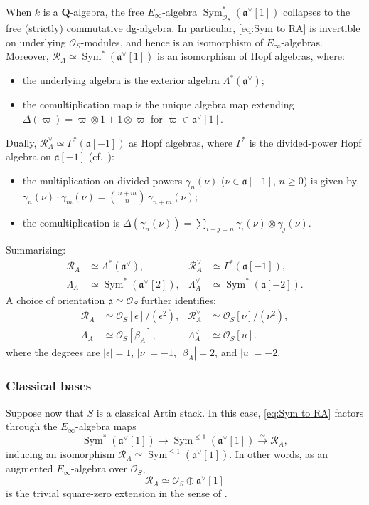 \documentclass[12pt, oneside]{amsart}
\numberwithin{equation}{section}
\theoremstyle{remark}
\theoremstyle{plain}
\renewcommand{\ge}{\geqslant}
\renewcommand{\le}{\leqslant}
\newcommand{\R}{\mathcal{R}}
\newcommand{\RA}{\R_A}
\newcommand{\fra}{\mathfrak{a}}
\newcommand{\frav}{\mathfrak{a}^\vee}
\newcommand{\lam}{\Lambda}
\newcommand{\lamco}{\Lambda^\vee}
\newcommand{\OO}{\mathcal{O}}
\DeclareMathOperator{\Sym}{Sym}
\begin{document}
When $k$ is a $\mathbf{Q}$-algebra, the free $E_\infty$-algebra $\Sym_{\OO_S}^*(\frav[1])$ collapses to the free (strictly) commutative dg-algebra.
In particular, \eqref{eq:Sym to RA} is invertible on underlying $\OO_S$-modules, and hence is an isomorphism of $E_\infty$-algebras.
Moreover, $\RA \simeq \Sym^*(\frav[1])$ is an isomorphism of Hopf algebras, where:
\begin{itemize}
  \item the underlying algebra is the exterior algebra $\Lambda^*(\frav)$;
  \item the comultiplication map is the unique algebra map extending $\Delta(\varpi) = \varpi \otimes 1 + 1 \otimes \varpi$ for $\varpi \in \frav[1]$.
\end{itemize}
Dually, $\RA^\vee \simeq \Gamma^*(\fra[-1])$ as Hopf algebras, where $\Gamma^*$ is the divided-power Hopf algebra on $\fra[-1]$ (cf.~\cite[Sect.~3]{BCN}):
\begin{itemize}
  \item the multiplication on divided powers $\gamma_n(\nu)$ ($\nu \in \fra[-1]$, $n \ge 0$) is given by $\gamma_n(\nu) \cdot \gamma_m(\nu) = \binom{n+m}{n}\,\gamma_{n+m}(\nu)$;
  \item the comultiplication is $\Delta(\gamma_n(\nu)) = \sum_{i+j=n} \gamma_i(\nu) \otimes \gamma_j(\nu)$.
\end{itemize}
Summarizing:
\begin{align*}
  \RA &\simeq \Lambda^*(\frav), & \RA^\vee &\simeq \Gamma^*(\fra[-1]), \\
  \lam_A &\simeq \Sym^*(\frav[2]), & \lamco_A &\simeq \Sym^*(\fra[-2]).
\end{align*}
A choice of orientation $\fra \simeq \OO_S$ further identifies:
\begin{align*}
  \RA &\simeq \OO_S[\epsilon]/(\epsilon^2), & \RA^\vee &\simeq \OO_S[\nu]/(\nu^2), \\
  \lam_A &\simeq \OO_S[\beta_A], & \lamco_A &\simeq \OO_S[u].
\end{align*}
where the degrees are $|\epsilon|=1$, $|\nu|=-1$, $|\beta_A|=2$, and $|u|=-2$.

\subsubsection{Classical bases}\label{sssec:funcheckA for k discrete}

Suppose now that $S$ is a classical Artin stack.
In this case, \eqref{eq:Sym to RA} factors through the $E_\infty$-algebra maps
\[
  \Sym^*(\frav[1])
  \to \Sym^{\le 1}(\frav[1])
  \xrightarrow{\sim} \RA,
\]
inducing an isomorphism $\RA \simeq \Sym^{\le 1}(\frav[1])$.
In other words, as an augmented $E_\infty$-algebra over $\OO_S$,
$$\RA \simeq \OO_S \oplus \frav[1]$$
is the trivial square-zero extension in the sense of \cite[Rem.~7.3.4.16]{LurieHA}.
\end{document}
